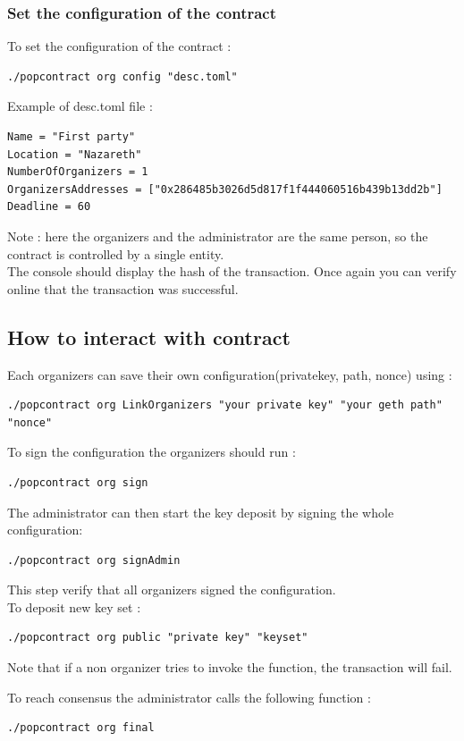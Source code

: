 \documentclass[11pt, a4paper, twoside, openright]{book} %
\begin{document}
\subsubsection*{Set the configuration of the contract}

To set the configuration of the contract :
\begin{lstlisting}
./popcontract org config "desc.toml"
\end{lstlisting}
Example of desc.toml file : 
\begin{lstlisting}
Name = "First party"
Location = "Nazareth"
NumberOfOrganizers = 1
OrganizersAddresses = ["0x286485b3026d5d817f1f444060516b439b13dd2b"]
Deadline = 60
\end{lstlisting}
Note : here the organizers and the administrator are the same person, so the contract is controlled by a single entity.\\
The console should display the hash of the transaction. Once again you can verify online that the transaction was successful.

\subsection{How to interact with contract}
Each organizers can save their own configuration(privatekey, path, nonce) using :  
\begin{lstlisting}
./popcontract org LinkOrganizers "your private key" "your geth path" "nonce"
\end{lstlisting}


To sign the configuration the organizers should run :
\begin{lstlisting}
./popcontract org sign 
\end{lstlisting}


The administrator can then start the key deposit by signing the whole configuration:
\begin{lstlisting}
./popcontract org signAdmin
\end{lstlisting}
This step verify that all organizers signed the configuration. \\

To deposit new key set :
\begin{lstlisting}
./popcontract org public "private key" "keyset"
\end{lstlisting}

Note that if a non organizer tries to invoke the function, the transaction will fail.

To reach consensus the administrator calls the following function :
\begin{lstlisting}
./popcontract org final
\end{lstlisting}
\end{document}
